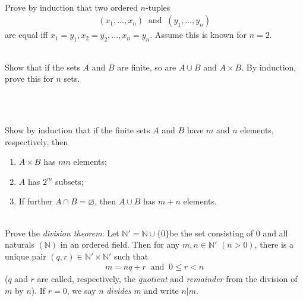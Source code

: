 \documentclass[12pt]{book}
\newcommand{\N}{\mathbb{N}}
\theoremstyle{definition}
\begin{document}
\begin{ex}[16]
\\
Prove by induction that two ordered $n$-tuples
\begin{align*}
	(x_1,\ldots, x_n)\;\; \text{and} \;\; (y_1, \ldots, y_n)
\end{align*}
are equal iff $x_1 = y_1, x_2= y_2, \ldots, x_n=y_n$. Assume this is known for $n=2$. 	
\end{ex}
\begin{ex}[17]
\\
Show that if the sets $A$ and $B$ are finite, so are $A \cup B$ and $A \times B$. By induction, prove this for $n$ sets.  	
\end{ex}
\begin{ex}[18]
\\
	
\end{ex}
\begin{ex}[19]
\\
Show by induction that if the finite sets $A$ and $B$ have $m$ and $n$ elements, respectively, then
\begin{enumerate}[label = (\roman*)]
	\item $A \times B$ has $mn$ elements;
	\item $A$ has $2^m$ subsets;
	\item If further $A \cap B = \varnothing$, then $A \cup B$ has $m+n$ elements.
\end{enumerate} 	
\end{ex}
\begin{ex}[20]
\\
Prove the \textit{division theorem}: Let $\N' = \N \cup \{0\}$be the set consisting of $0$ and all naturals $(\N)$ in an ordered field. Then for any $m,n \in \N'$ $(n>0)$, there is a unique pair $(q,r) \in \N' \times \N'$ such that
\begin{align*}
	m=nq +r\;\; \text{and} \;\; 0 \leq r <n
\end{align*}
($q$ and $r$ are called, respectively, the \textit{quotient} and \textit{remainder} from the division of $m$ by $n$). If $r= 0$, we say $n$ \textit{divides} $m$ and write $n|m$.
\end{ex}

\end{document}
